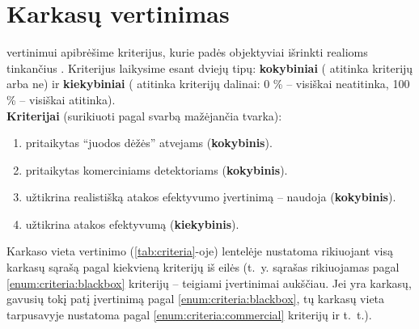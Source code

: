 \section{Karkasų vertinimas}\label{sec:criteria}

 vertinimui apibrėšime kriterijus, kurie padės objektyviai išrinkti
realioms  tinkančius . Kriterijus
laikysime esant dviejų tipų: \textbf{kokybiniai} ( atitinka
kriterijų arba ne) ir \textbf{kiekybiniai} ( atitinka
kriterijų dalinai: 0 \% -- visiškai neatitinka, 100 \% -- visiškai atitinka). \\

\textbf{Kriterijai} (surikiuoti pagal svarbą mažėjančia tvarka):
\vspace{-5pt}
\begin{enumerate}[label=K-\arabic*., ref=K-\arabic*]
    \item {} pritaikytas \enquote{juodos dėžės} atvejams (\textbf{kokybinis}).\label{enum:criteria:blackbox}
    \item {} pritaikytas komerciniams detektoriams (\textbf{kokybinis}).\label{enum:criteria:commercial}
    \item {} užtikrina realistišką atakos efektyvumo įvertinimą -- naudoja  (\textbf{kokybinis}).\label{enum:criteria:surrogate}
    \item {} užtikrina atakos efektyvumą (\textbf{kiekybinis}).\label{enum:criteria:effective}
\end{enumerate}

Karkaso vieta vertinimo (\ref{tab:criteria}-oje) lentelėje nustatoma rikiuojant visą karkasų sąrašą pagal kiekvieną kriterijų iš eilės (t.~y. sąrašas rikiuojamas pagal \ref{enum:criteria:blackbox} kriterijų -- teigiami įvertinimai aukščiau. Jei yra karkasų, gavusių tokį patį įvertinimą pagal \ref{enum:criteria:blackbox}, tų karkasų vieta tarpusavyje nustatoma pagal \ref{enum:criteria:commercial} kriterijų ir t.~t.).

\newenvironment{criteriaTable}{
    \newcommand{\rowLast}[1]{##1}
    \newcommand{\row}[1]{##1 \\}
    \newcommand{\tbl}[1]{\gdef\Table{##1}}

    \def\Table{}
}{
    \begin{table}[h]
        \centering
        \caption{\Glsplwhom{framework} vertinimas pagal kriterijus. \Glspl{framework} surikiuoti pagal įvertinimą mažėjančia tvarka.}\label{tab:criteria}
        \begin{tabular}{l|c|c|c|S}
            \row{
            \textbf{\Glsshort{framework}}           &
            \textbf{\ref{enum:criteria:blackbox}}   &
            \textbf{\ref{enum:criteria:commercial}} &
            \textbf{\ref{enum:criteria:surrogate}}  &
                \textbf{\ref{enum:criteria:effective}}
            } \midrule
            \Table{}
        \end{tabular}
    \end{table}
}


